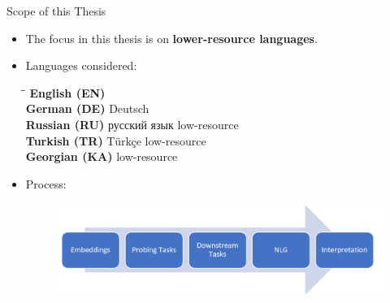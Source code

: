 \documentclass[accentcolor=tud1a,colorbacktitle,inverttitle,landscape,german,presentation,t]{tudbeamer}
\begin{document}
\begin{frame}{Scope of this Thesis}{}
	\vspace*{-4mm}
	\begin{itemize}\setlength\itemsep{1em}
		\item The focus in this thesis is on \textbf{lower-resource languages}.
		\item Languages considered:

		\vspace*{2mm}
		{\small
		\begin{tabbing}
			\hspace*{3.5cm}\=\hspace*{3.5cm}\=\kill
			\textbf{English (EN)} 		\>											\>					\\
			\textbf{German (DE)}		\> Deutsch 									\> 					\\
			\textbf{Russian (RU)} 		\> \foreignlanguage{russian}{русский язык} 	\>	low-resource 	\\
			\textbf{Turkish (TR)} 		\> Türkçe 									\> 	low-resource 	\\
			\textbf{Georgian (KA)}	\> {} 						\> 	low-resource
		\end{tabbing}}
		
		\item Process:
		\begin{figure}
			\includegraphics[scale=0.2]{images/thesis_process}
		\end{figure}
	\end{itemize}
\end{frame}
\end{document}
